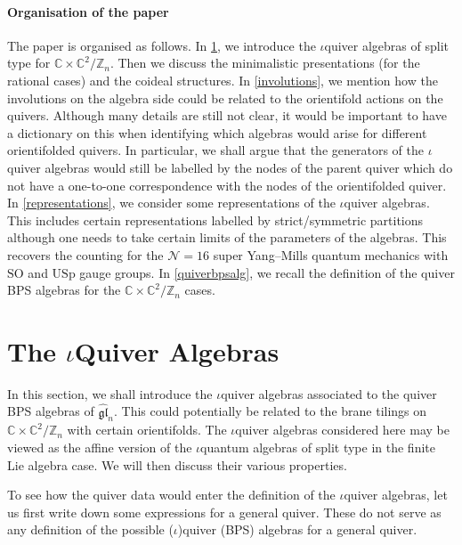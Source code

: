 \documentclass[11pt]{article}
\numberwithin{equation}{section}
\numberwithin{figure}{section}
\numberwithin{table}{section}
\newcommand{\SO}{\mathrm{SO}}
\newcommand{\USp}{\mathrm{USp}}
\begin{document}
\paragraph{Organisation of the paper} The paper is organised as follows. In \cref{iquiveralg}, we introduce the $\iota$quiver algebras of split type for $\mathbb{C}\times\mathbb{C}^2/\mathbb{Z}_n$. Then we discuss the minimalistic presentations (for the rational cases) and the coideal structures. In \cref{involutions}, we mention how the involutions on the algebra side could be related to the orientifold actions on the quivers. Although many details are still not clear, it would be important to have a dictionary on this when identifying which algebras would arise for different orientifolded quivers. In particular, we shall argue that the generators of the $\iota$quiver algebras would still be labelled by the nodes of the parent quiver which do not have a one-to-one correspondence with the nodes of the orientifolded quiver. In \cref{representations}, we consider some representations of the $\iota$quiver algebras. This includes certain representations labelled by strict/symmetric partitions although one needs to take certain limits of the parameters of the algebras. This recovers the counting for the $\mathcal{N}=16$ super Yang--Mills quantum mechanics with $\SO$ and $\USp$ gauge groups. In \cref{quiverbpsalg}, we recall the definition of the quiver BPS algebras for the $\mathbb{C}\times\mathbb{C}^2/\mathbb{Z}_n$ cases.

\section{The \texorpdfstring{$\iota$Quiver}{iQuiver} Algebras}\label{iquiveralg}
In this section, we shall introduce the $\iota$quiver algebras associated to the quiver BPS algebras of $\widehat{\mathfrak{gl}}_n$. This could potentially be related to the brane tilings on $\mathbb{C}\times\mathbb{C}^2/\mathbb{Z}_n$ with certain orientifolds. The $\iota$quiver algebras considered here may be viewed as the affine version of the $\iota$quantum algebras of split type in the finite Lie algebra case. We will then discuss their various properties.

To see how the quiver data would enter the definition of the $\iota$quiver algebras, let us first write down some expressions for a general quiver. These do not serve as any definition of the possible ($\iota$)quiver (BPS) algebras for a general quiver.
\end{document}

